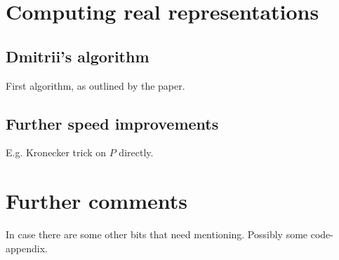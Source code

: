 \documentclass[11pt]{article}
\begin{document}
\section{Computing real representations}

\subsection{Dmitrii's algorithm}

First algorithm, as outlined by the paper.

\subsection{Further speed improvements}

E.g. Kronecker trick on $P$ directly.

\section{Further comments}

In case there are some other bits that need mentioning. Possibly some code-appendix.

\printbibliography[title={References}]
%
%
\end{document}
